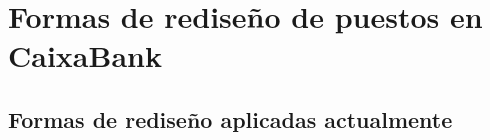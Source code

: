 %
%
%
%
%
%
%
%

\section{Formas de rediseño de puestos en CaixaBank}

\subsection{Formas de rediseño aplicadas actualmente}

